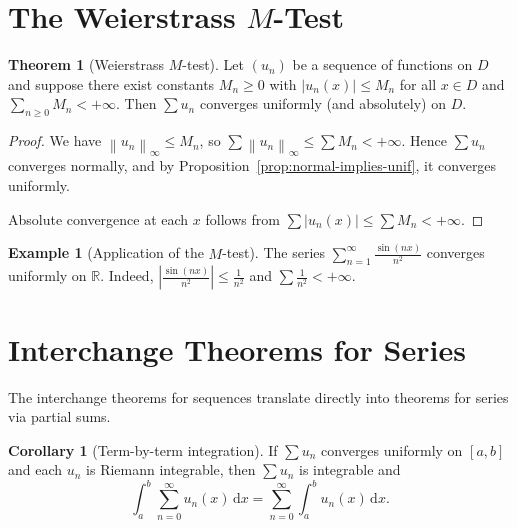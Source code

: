 \documentclass[12pt,a4paper]{book}
\theoremstyle{definition}
\newtheorem{theorem}{Theorem}[chapter]
\newtheorem{corollary}{Corollary}[chapter]
\newtheorem{example}{Example}[chapter]
\newcommand{\R}{\mathbb{R}}
\newcommand{\abs}[1]{\left\lvert #1 \right\rvert}
\newcommand{\norm}[1]{\left\lVert #1 \right\rVert}
\newcommand{\dd}{\,\mathrm{d}}
\begin{document}
\section{The Weierstrass \texorpdfstring{$M$}{M}-Test}\label{sec:M-test}

\begin{theorem}[Weierstrass $M$-test]\label{thm:M-test}
  Let $(u_n)$ be a sequence of functions on $D$ and suppose there exist
  constants $M_n\ge0$ with $\abs{u_n(x)}\le M_n$ for all $x\in D$ and
  $\sum_{n\ge0}M_n<+\infty$.  Then $\sum u_n$ converges uniformly
  (and absolutely) on $D$.
\end{theorem}

\begin{proof}
  We have $\norm{u_n}_\infty\le M_n$, so
  $\sum\norm{u_n}_\infty\le\sum M_n<+\infty$.  Hence $\sum u_n$
  converges normally, and by Proposition~\ref{prop:normal-implies-unif},
  it converges uniformly.

  Absolute convergence at each $x$ follows from
  $\sum\abs{u_n(x)}\le\sum M_n<+\infty$.
\end{proof}

\begin{example}[Application of the $M$-test]\label{ex:M-test-example}
  The series $\displaystyle\sum_{n=1}^{\infty}\frac{\sin(nx)}{n^2}$
  converges uniformly on $\R$.  Indeed,
  $\abs{\frac{\sin(nx)}{n^2}}\le\frac{1}{n^2}$ and
  $\sum\frac{1}{n^2}<+\infty$.
\end{example}


\section{Interchange Theorems for Series}\label{sec:interchange-series}

The interchange theorems for sequences translate directly into theorems
for series via partial sums.

\begin{corollary}[Term-by-term integration]\label{cor:termwise-int}
  If $\sum u_n$ converges uniformly on $[a,b]$ and each $u_n$ is Riemann
  integrable, then $\sum u_n$ is integrable and
  \[
    \int_a^b\sum_{n=0}^{\infty}u_n(x)\dd x
    = \sum_{n=0}^{\infty}\int_a^b u_n(x)\dd x.
  \]
\end{corollary}
\end{document}
